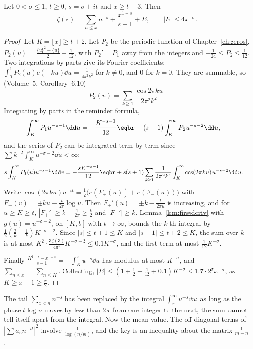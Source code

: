 \begin{lemma}\label{lem:zetalengtht}
Let $0<\sigma\le1$, $t\ge0$, $s=\sigma+it$ and $x\ge t+3$. Then
\[
\zeta(s)=\sum_{n\le x}n^{-s}+\frac{x^{1-s}}{s-1}+E,\qquad|E|\le4x^{-\sigma}.
\]
\end{lemma}
\begin{proof}
Let $K=\lfloor x\rfloor\ge t+2$. Let $P_2$ be the periodic function of Chapter~\ref{ch:zeros}, $P_2(u)=\frac{\{u\}^2-\{u\}}2+\frac1{12}$, with $P_2'=P_1$ away from the integers and $-\frac1{24}\le P_2\le\frac1{12}$. Two integrations by parts give its Fourier coefficients: $\int_0^1P_2(u)e(-ku)\dd u=\frac1{4\pi^2k^2}$ for $k\ne0$, and $0$ for $k=0$. They are summable, so (Volume~5, Corollary~6.10)
\[
P_2(u)=\sum_{k\ge1}\frac{\cos2\pi ku}{2\pi^2k^2}.
\]
Integrating by parts in the reminder formula,
\[
\begin{aligned}\int_K^\infty P_1u^{-s-1}\dd u&=-\frac{K^{-s-1}}{12}\eqbr+(s+1)\int_K^\infty P_2u^{-s-2}\dd u,\end{aligned}
\]
and the series of $P_2$ can be integrated term by term since $\sum k^{-2}\int_K^\infty u^{-\sigma-2}\dd u<\infty$:
\[
\begin{aligned}s\int_K^\infty P_1(u)u^{-s-1}\dd u&=-\frac{sK^{-s-1}}{12}\eqbr+s(s+1)\sum_{k\ge1}\frac1{2\pi^2k^2}\int_K^\infty\cos(2\pi ku)\,u^{-s-2}\dd u.\end{aligned}
\]
Write $\cos(2\pi ku)u^{-it}=\frac12\bigl(e(F_+(u))+e(F_-(u))\bigr)$ with $F_\pm(u)=\pm ku-\frac t{2\pi}\log u$. Then $F_\pm'(u)=\pm k-\frac t{2\pi u}$ is increasing, and for $u\ge K\ge t$, $|F_+'|\ge k-\frac1{2\pi}\ge\frac k2$ and $|F_-'|\ge k$. Lemma~\ref{lem:firstderiv} with $g(u)=u^{-\sigma-2}$, on $[K,b]$ with $b\to\infty$, bounds the $k$-th integral by $\frac12(\frac2k+\frac1k)K^{-\sigma-2}$. Since $|s|\le t+1\le K$ and $|s+1|\le t+2\le K$, the sum over $k$ is at most $K^2\cdot\frac{3\zeta(3)}{4\pi^2}K^{-\sigma-2}\le0.1K^{-\sigma}$, and the first term at most $\frac1{12}K^{-\sigma}$.

Finally $\frac{K^{1-s}-x^{1-s}}{s-1}=-\int_K^xu^{-s}\dd u$ has modulus at most $K^{-\sigma}$, and $\sum_{n\le x}=\sum_{n\le K}$. Collecting, $|E|\le(1+\frac12+\frac1{12}+0.1)K^{-\sigma}\le1.7\cdot2^\sigma x^{-\sigma}$, as $K\ge x-1\ge\frac x2$.
\end{proof}

The tail $\sum_{x<n}n^{-s}$ has been replaced by the integral $\int_x^\infty u^{-s}\dd u$: as long as the phase $t\log n$ moves by less than $2\pi$ from one integer to the next, the sum cannot tell itself apart from the integral. Now the mean value. The off-diagonal terms of $|\sum a_nn^{-it}|^2$ involve $\frac1{\log(n/m)}$, and the key is an inequality about the matrix $\frac1{m-n}$.

